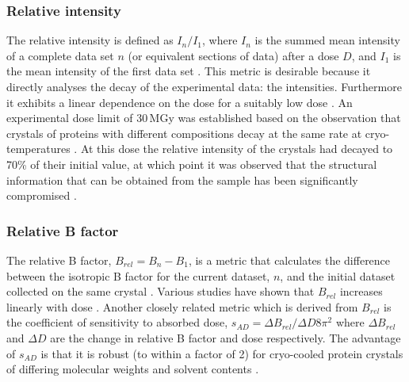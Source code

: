         \subsubsection{Relative intensity}
        \label{subs:Relative intensity}
            The relative intensity is defined as $I_n/I_1$, where $I_n$ is the summed mean intensity of a complete data set $n$ (or equivalent sections of data) after a dose $D$, and $I_1$ is the mean intensity of the first data set \cite{garman2010}.
            This metric is desirable because it directly analyses the decay of the experimental data: the intensities. Furthermore it exhibits a linear dependence on the dose for a suitably low dose \cite{owen2006,zeldin2013dwd}.
            An experimental dose limit of 30\,MGy was established based on the observation that crystals of proteins with different compositions decay at the same rate at cryo-temperatures \cite{owen2006}.
            At this dose the relative intensity of the crystals had decayed to 70\% of their initial value, at which point it was observed that the structural information that can be obtained from the sample has been significantly compromised \cite{owen2006,blundell1976protein}.

        \subsubsection{Relative B factor}
        \label{subs:Relative B factor}
            The relative B factor, $B_{rel} = B_n - B_1$, is a metric that calculates the difference between the isotropic B factor for the current dataset, $n$, and the initial dataset collected on the same crystal \cite{kmetko2006}.
            Various studies have shown that $B_{rel}$ increases linearly with dose \cite{kmetko2006,borek2007many,bourenkov2010optimization,leal2012}.
            Another closely related metric which is derived from $B_{rel}$ is the coefficient of sensitivity to absorbed dose, $s_{AD} = \Delta B_{rel} / \Delta D 8\pi^2$ where $\Delta B_{rel}$ and $\Delta D$ are the change in relative B factor and dose respectively.
            The advantage of $s_{AD}$ is that it is robust (to within a factor of 2) for cryo-cooled protein crystals of differing molecular weights and solvent contents \cite{kmetko2006}.


